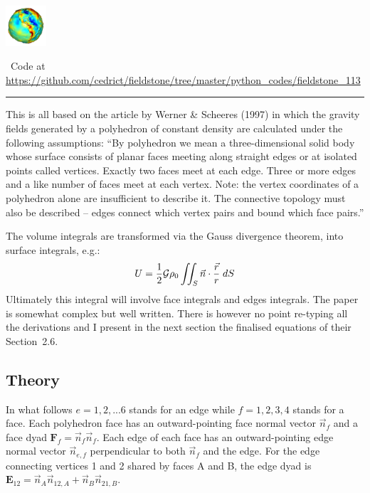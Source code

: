 
\includegraphics[height=1.5cm]{images/pictograms/gravity}



\begin{center}
\inpython~Code at \url{https://github.com/cedrict/fieldstone/tree/master/python_codes/fieldstone_113}
\end{center}

\par\noindent\rule{\textwidth}{0.4pt}



This is all based on the article by Werner \& Scheeres (1997) \cite{wesc97} in which 
the gravity fields generated by a polyhedron 
of constant density are calculated under the following assumptions:
``By polyhedron we mean a three-dimensional solid body whose surface consists of planar faces 
meeting along straight edges or at isolated points called vertices. Exactly two faces meet 
at each edge. Three or more edges and a like number of faces meet at each vertex. Note: 
the vertex coordinates of a polyhedron alone are insufficient to describe it. The connective 
topology must also be described -- edges connect which vertex pairs and bound which face pairs.''

The volume integrals are transformed via the Gauss divergence theorem, into surface integrals, e.g.:
\[
U = \frac12 {\cal G} \rho_0 \iint_S \vec{n} \cdot \frac{\vec{r}}{r} \; dS
\]
Ultimately this integral will involve face integrals and edges integrals.
The paper is somewhat complex but well written. There is however no point re-typing all 
the derivations and I present in the next section the finalised equations of their Section~2.6.


\subsection*{Theory}


In what follows $e=1,2,...6$ stands for an edge while $f=1,2,3,4$ stands
for a face. 
Each polyhedron face has an outward-pointing face normal vector $\vec{n}_f$
and a face dyad ${\bm F}_f =\vec{n}_f\vec{n}_f $.
Each edge of each face has an outward-pointing edge normal
vector $\vec{n}_{e,f}$ perpendicular to both $\vec{n}_f$ and the edge.
For the edge connecting vertices 1 and 2 shared by faces A and B,
the edge dyad is ${\bm E}_{12}=\vec{n}_A \vec{n}_{12,A}+\vec{n}_B \vec{n}_{21,B}$.

